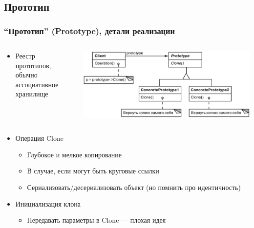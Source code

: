 \documentclass[xetex,mathserif,serif]{beamer}
\begin{document}
    \subsection{Прототип}

    \begin{frame}
        \frametitle{``Прототип'' (Prototype), детали реализации}
        \begin{columns}
            \begin{column}{0.45\textwidth}
                \begin{itemize}
                    \item Реестр прототипов, обычно ассоциативное хранилище
                \end{itemize}
            \end{column}
            \begin{column}{0.55\textwidth}
                \begin{center}
                    \includegraphics[width=\textwidth]{prototype.png}
                \end{center}
            \end{column}
        \end{columns}
        \begin{itemize}
            \item Операция Clone
            \begin{itemize}
                \item Глубокое и мелкое копирование
                \item В случае, если могут быть круговые ссылки
                \item Сериализовать/десериализовать объект (но помнить про идентичность)
            \end{itemize}
            \item Инициализация клона
            \begin{itemize}
                \item Передавать параметры в Clone --- плохая идея
            \end{itemize}
        \end{itemize}
    \end{frame}
\end{document}
